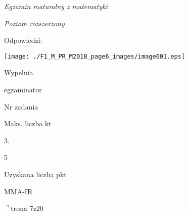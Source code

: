 \documentclass[a4paper,12pt]{article}
\begin{document}
{\it Egzamin maturalny z matematyki}

{\it Poziom rozszerzony}

Odpowiedzí:
\begin{center}
\texttt{[image: ./F1\_M\_PR\_M2018\_page6\_images/image001.eps]}
\end{center}
Wypelnia

egzaminator

Nr zadania

Maks. liczba kt

3.

5

Uzyskana liczba pkt

MMA-IR

$\urcorner$trona 7$\mathrm{z}20$
\end{document}

